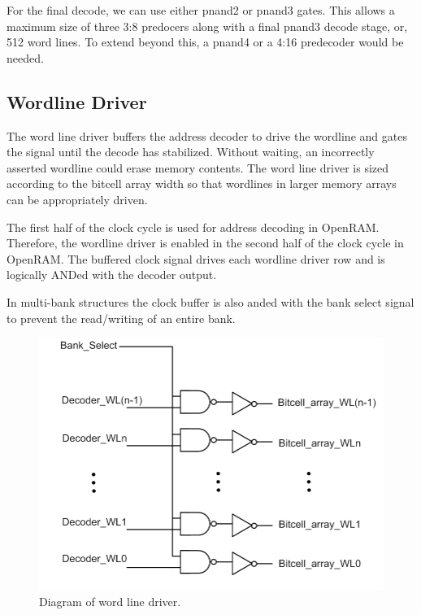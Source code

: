 For the final decode, we can use either pnand2 or pnand3 gates. This
allows a maximum size of three 3:8 predocers along with a final pnand3 decode
stage, or, 512 word lines. To extend beyond this, a pnand4 or
a 4:16 predecoder would be needed.


\subsection{Wordline Driver}
\label{sec:wldriver}

The word line driver buffers the address decoder to drive the wordline and
gates the signal until the decode has stabilized. Without waiting, an
incorrectly asserted wordline could erase memory contents.
The word line driver is sized according to the bitcell array width so
that wordlines in larger memory arrays can be appropriately driven.

The first half of the clock cycle is used for address decoding in
OpenRAM.  Therefore, the wordline driver is enabled in the second half
of the clock cycle in OpenRAM.  The buffered clock signal drives each
wordline driver row and is logically ANDed with the decoder output.

In multi-bank structures the clock buffer is also anded with the bank
select signal to prevent the read/writing of an entire bank.

\begin{figure}[h!]
\centering
\includegraphics[scale=.6]{./figs/wordline_driver.pdf}
\caption{Diagram of word line driver.}
\label{fig:wordline_driver}
\end{figure}

